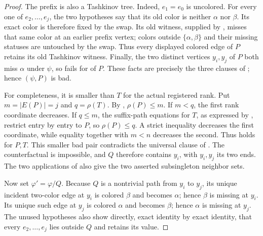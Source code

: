 \begin{proof}
The prefix is also a Tashkinov tree.  Indeed, \(e_1=e_0\) is uncolored.
For every one of \(e_2,\ldots,e_j\), the two hypotheses
 say that its old color is neither
\(\alpha\) nor \(\beta\).  Its exact color is therefore fixed by the
swap.  Its old witness, supplied by , misses that
same color at an earlier prefix vertex; colors outside
\(\{\alpha,\beta\}\) and their missing statuses are untouched by the
swap.  Thus every displayed colored edge of \(P\) retains its old
Tashkinov witness.  Finally, the two distinct vertices \(y_i,y_j\) of
\(P\) both miss \(\alpha\) under \(\psi\), so
 fails for
 of \(P\).  These facts are precisely the
three clauses of ; hence \((\psi,P)\) is bad.

For completeness, it is smaller than \(T\) for the actual registered
rank.  Put \(m=|E(P)|=j\) and \(q=\rho(T)\).  By
, \(\rho(P)\le m\).  If \(m<q\), the first
rank coordinate decreases.  If \(q\le m\), the suffix-path equations for
\(T\), as expressed by , restrict entry by
entry to \(P\), so \(\rho(P)\le q\).  A strict inequality decreases the
first coordinate, while equality together with \(m<n\) decreases the
second.  Thus  holds for \(P,T\).  This smaller
bad pair contradicts the universal clause of
.  The counterfactual is impossible, and
\(Q\) therefore contains \(y_i\), with \(y_i,y_j\) its two ends.  The
two applications of  also give
the two asserted subsingleton neighbor sets.

Now set \(\varphi'=\varphi/Q\).  Because \(Q\) is a nontrivial path from
\(y_i\) to \(y_j\), its unique incident two-color edge at \(y_i\) is
colored \(\beta\) and becomes \(\alpha\); hence \(\beta\) is missing at
\(y_i\).  Its unique such edge at \(y_j\) is colored \(\alpha\) and
becomes \(\beta\); hence \(\alpha\) is missing at \(y_j\).  The unused
hypotheses also show directly, exact identity by exact identity, that
every \(e_2,\ldots,e_j\) lies outside \(Q\) and retains its value.


\end{proof}
